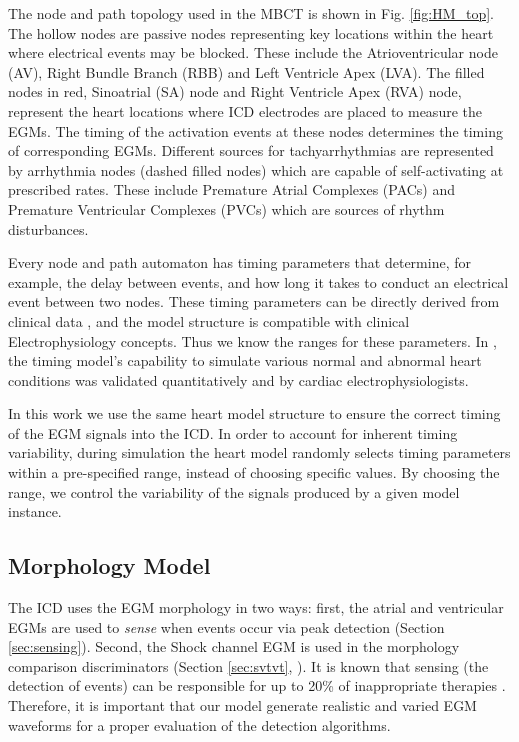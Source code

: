 The node and path topology used in the MBCT is shown in Fig. \ref{fig:HM_top}. 
The hollow nodes are passive nodes representing key locations within the heart where electrical events may be blocked. These include the Atrioventricular node (AV), Right Bundle Branch (RBB) and Left Ventricle Apex (LVA). 
The filled nodes in red, Sinoatrial (SA) node and Right Ventricle Apex (RVA) node, represent the heart locations where ICD electrodes are placed to measure the EGMs.
The timing of the activation events at these nodes determines the timing of corresponding EGMs.
Different sources for tachyarrhythmias are represented by arrhythmia nodes (dashed filled nodes) which are capable of self-activating at prescribed rates. These include Premature Atrial Complexes (PACs) and Premature Ventricular Complexes (PVCs) which are sources of rhythm disturbances.

Every node and path automaton has timing parameters that determine, for example, the delay between events, and how long it takes to conduct an electrical event between two nodes.
These timing parameters can be directly derived from clinical data \cite{josephson}, and the model structure is compatible with clinical Electrophysiology concepts.
Thus we know the ranges for these parameters.
In \cite{VHM_proc}, the timing model's capability to simulate various normal and abnormal heart conditions was validated quantitatively and by cardiac electrophysiologists.


In this work we use the same heart model structure to ensure the correct timing of the EGM signals into the ICD.
In order to account for inherent timing variability, during simulation the heart model randomly selects timing parameters within a pre-specified range, instead of choosing specific values. 
By choosing the range, we control the variability of the signals produced by a given model instance.

\subsection{Morphology Model}
The ICD uses the EGM morphology in two ways:
first, the atrial and ventricular EGMs are used to \emph{sense} when events occur via peak detection (Section \ref{sec:sensing}).
Second, the Shock channel EGM is used in the morphology comparison discriminators (Section \ref{sec:svtvt}, \cite{VTC,Wavelet}).
It is known that sensing (the detection of events) can be responsible for up to 20\% of inappropriate therapies \cite{wrong_sensing}.
Therefore, it is important that our model generate realistic and varied EGM waveforms for a proper evaluation of the detection algorithms.

